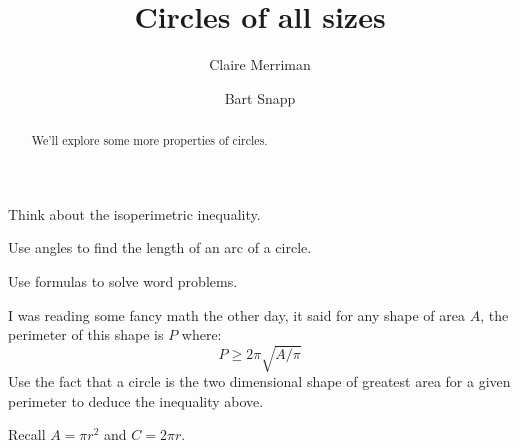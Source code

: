 \documentclass[noauthor,hints,nooutcomes,handout]{ximera}
\title{Circles of all sizes}
\author{Claire Merriman \and Bart Snapp}
\begin{document}
\begin{abstract}
  We'll explore some more properties of circles.
\end{abstract}
\maketitle

\begin{listOutcomes}
  \item Think about the isoperimetric inequality.
\item Use angles to find the length of an arc of a circle.
\item Use formulas to solve word problems.
\end{listOutcomes}



\mynewpage

\begin{question}
  I was reading some fancy math the other day, it said for any shape
  of area $A$, the perimeter of this shape is $P$ where:
  \[
  P \ge 2\pi\sqrt{A/\pi}
  \]
  Use the fact that a circle is the two dimensional shape of greatest
  area for a given perimeter to deduce the inequality above.
  \begin{hint} Recall $A = \pi r^2$ and $C = 2\pi r$.
  \end{hint}
\end{question}
\mynewpage
\end{document}
